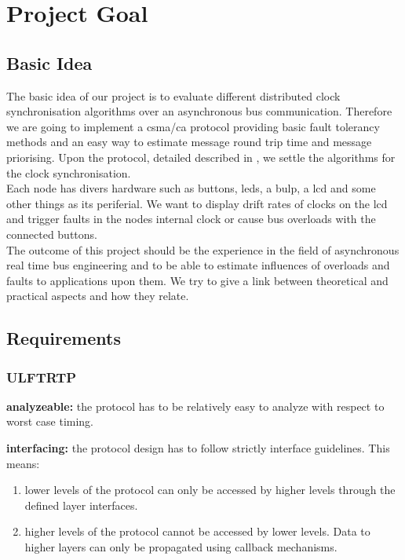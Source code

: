 \section{Project Goal}

\subsection{Basic Idea}
The basic idea of our project is to evaluate different distributed clock synchronisation algorithms over an asynchronous bus communication. Therefore we are going to implement a csma/ca protocol providing basic fault tolerancy methods and an easy way to estimate message round trip time and message priorising.
Upon the protocol, detailed described in \cite[NESD2]{NESD2}, we settle the algorithms for the clock synchronisation.\\

Each node has divers hardware such as buttons, leds, a bulp, a lcd and some other things as its periferial. We want to display drift rates of clocks on the lcd and trigger faults in the nodes internal clock or cause bus overloads with the connected buttons.\\

The outcome of this project should be the experience in the field of asynchronous real time bus engineering and to be able to estimate influences of overloads and faults to applications upon them.
We try to give a link between theoretical and practical aspects and how they relate.

\subsection{Requirements}

\subsubsection{ULFTRTP}
\begin{req}
\label{req:ulftrtp:analyzeable}
\textbf{analyzeable: }the protocol has to be relatively easy to analyze with respect to worst case timing.
\end{req}

\begin{req}
\label{req:ulftrtp:interfacing}
\textbf{interfacing: }the protocol design has to follow strictly interface guidelines. This means:
\begin{enumerate}
 \item lower levels of the protocol can only be accessed by higher levels through the defined layer interfaces.
 \item higher levels of the protocol cannot be accessed by lower levels. Data to higher layers can only be propagated using callback mechanisms. 
\end{enumerate}

\end{req}

